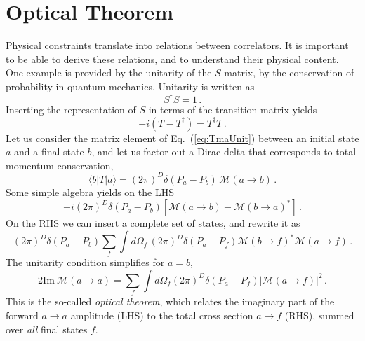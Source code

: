 \section{Optical Theorem}
\label{sec:optical-theorem}

Physical constraints translate into relations between correlators. It
is important to be able to derive these relations, and to understand
their physical content. One example is provided by the unitarity of
the $S$-matrix, \ie by the conservation of probability in quantum
mechanics. Unitarity is written as
\begin{equation}
  \label{eq:SmatUnit}
  S^\dagger S = 1\, .
\end{equation}
Inserting the representation of $S$ in terms of the transition matrix
yields
\begin{equation}
  \label{eq:TmaUnit}
  -i \left(T - T^\dagger\right) = T^\dagger T\, .
\end{equation}
Let us consider the matrix element of Eq.~(\ref{eq:TmaUnit}) between an
initial state $a$ and a final state $b$, and let us factor out a Dirac
delta that corresponds to total momentum conservation, 
\begin{equation}
  \label{eq:MAmplitude}
  \langle b | T | a\rangle = (2\pi)^D \delta(P_a - P_b)\, \mathcal{M}(a
  \to b)\, .
\end{equation}
Some simple algebra yields on the LHS
\begin{equation}
  \label{eq:MLHS}
  -i (2\pi)^D \delta\left(P_a-P_b\right) \left[
    \mathcal{M}(a\to b) - \mathcal{M}(b \to a)^*
    \right]\, . 
\end{equation}
On the RHS we can insert a complete set of states, and rewrite it as
\begin{equation}
  \label{eq:MRHS}
   (2\pi)^D \delta\left(P_a-P_b\right) \sum_f \int d\Omega_f\,
   (2\pi)^D \delta\left(P_a-P_f\right) \mathcal{M}(b\to f)^*
   \mathcal{M}(a\to f)\, .
 \end{equation}
The unitarity condition simplifies for $a=b$, 
\begin{equation}
  \label{eq:OptThm}
  2 \mathrm{Im}\ \mathcal{M}(a\to a) = 
  \sum_f \int d\Omega_f  (2\pi)^D \delta\left(P_a-P_f\right) 
  \left|
    \mathcal{M}(a\to f)
  \right|^2\, .
\end{equation}
This is the so-called {\em optical theorem}, which relates the
imaginary part of the forward $a\to a$ amplitude (LHS) to the total cross
section $a\to f$ (RHS), summed over {\em all} final states $f$.

